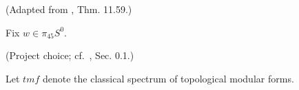 \begin{definition}
\label{frontier:Literature:75fd0d147c9c}
(Adapted from \cite{BR21}, Thm. 11.59.)\par{}

Fix $w\in\pi_{45}S^0$.
\end{definition}

\begin{definition}
\label{frontier:Literature:79d2c0d8349e}
(Project choice; cf.\ \cite{BR21}, Sec. 0.1.)\par{}

Let $\mathit{tmf}$ denote the classical spectrum of topological modular forms.
\end{definition}

